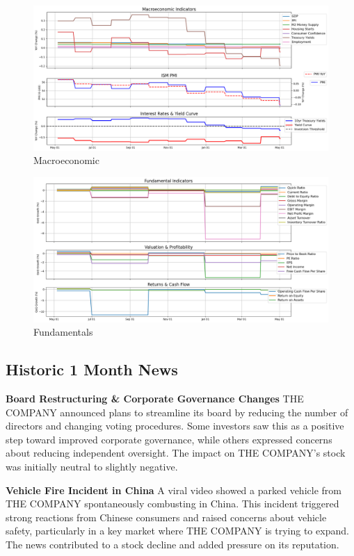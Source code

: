 \documentclass[8pt]{scrartcl}
\begin{document}
\begin{figure}[H]
    \centering
    \includegraphics[width=1\linewidth]{judge_reviews/TSLA_M_gpt-4o-mini/2019-05-05/judge_Macroeconomic_Indicators.png}
    \caption{Macroeconomic}
\end{figure}

\begin{figure}[H]
    \centering
    \includegraphics[width=1\linewidth]{judge_reviews/TSLA_M_gpt-4o-mini/2019-05-05/judge_Fundamental_Indicators.png}
    \caption{Fundamentals}
\end{figure}


\subsection*{Historic 1 Month News}

\textbf{Board Restructuring \& Corporate Governance Changes}
THE COMPANY announced plans to streamline its board by reducing the number of directors and changing voting procedures. Some investors saw this as a positive step toward improved corporate governance, while others expressed concerns about reducing independent oversight. The impact on THE COMPANY's stock was initially neutral to slightly negative.

\textbf{Vehicle Fire Incident in China}
A viral video showed a parked vehicle from THE COMPANY spontaneously combusting in China. This incident triggered strong reactions from Chinese consumers and raised concerns about vehicle safety, particularly in a key market where THE COMPANY is trying to expand. The news contributed to a stock decline and added pressure on its reputation.
\end{document}
